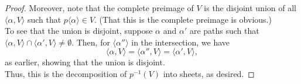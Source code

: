 \documentclass[12pt]{article}
\begin{document}
\begin{proof}
Moreover, note that the complete preimage of $V$ is the disjoint union of all $\langle \alpha, V\rangle$ such that $p\langle \alpha\rangle \in V.$ (That this is the complete preimage is obvious.) \\
To see that the union is disjoint, suppose $\alpha$ and $\alpha'$ are paths such that $\langle \alpha, V\rangle \cap \langle \alpha', V\rangle \neq \emptyset.$ Then, for $\langle \alpha''\rangle$ in the intersection, we have
\begin{equation*} 
	\langle \alpha, V\rangle = \langle \alpha'', V\rangle = \langle \alpha', V\rangle,
\end{equation*} 
as earlier, showing that the union is disjoint.\\
Thus, this is the decomposition of $p^{-1}(V)$ into sheets, as desired.

\dotfill


\end{proof}
\end{document}
